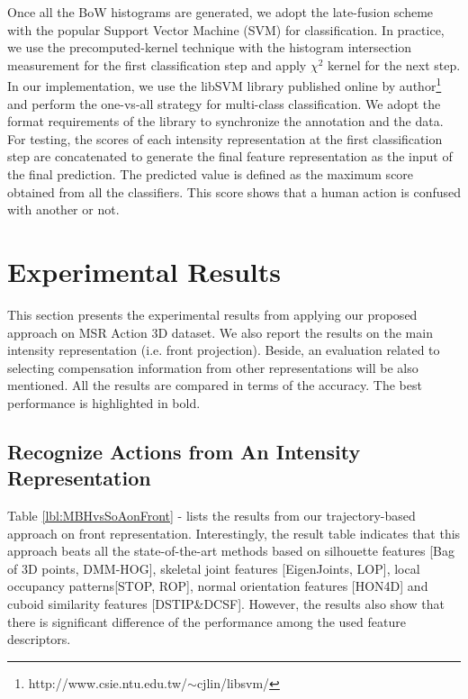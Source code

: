 \documentclass[review]{elsarticle}
\begin{document}
Once all the BoW histograms are generated, we adopt the late-fusion scheme with the popular Support Vector Machine (SVM) for classification. In practice, we use the precomputed-kernel technique with the histogram intersection measurement for the first classification step and apply $\chi^2$ kernel for the next step. In our implementation, we use the libSVM library published online by author\footnote{http://www.csie.ntu.edu.tw/$\sim$cjlin/libsvm/} and perform the one-vs-all strategy for multi-class classification. We adopt the format requirements of the library to synchronize the annotation and the data. For testing, the scores of each intensity representation at the first classification step are concatenated to generate the final feature representation as the input of the final prediction. The predicted value is defined as the maximum score obtained from all the classifiers. This score shows that a human action is confused with another or not.

\section{Experimental Results}

This section presents the experimental results from applying our proposed approach on MSR Action 3D dataset. We also report the results on the main intensity representation (i.e. front projection). Beside, an evaluation related to selecting compensation information from other representations will be also mentioned. All the results are compared in terms of the accuracy. The best performance is highlighted in bold.

\subsection{Recognize Actions from An Intensity Representation}

Table \ref{lbl:MBHvsSoAonFront} - lists the results from our trajectory-based approach on front representation. Interestingly, the result table indicates that this approach beats all the state-of-the-art methods based on silhouette features [Bag of 3D points, DMM-HOG], skeletal joint features [EigenJoints, LOP], local occupancy patterns[STOP, ROP], normal orientation features [HON4D] and cuboid similarity features [DSTIP\&DCSF]. However, the results also show that there is significant difference of the performance among the used feature descriptors.
\end{document}
